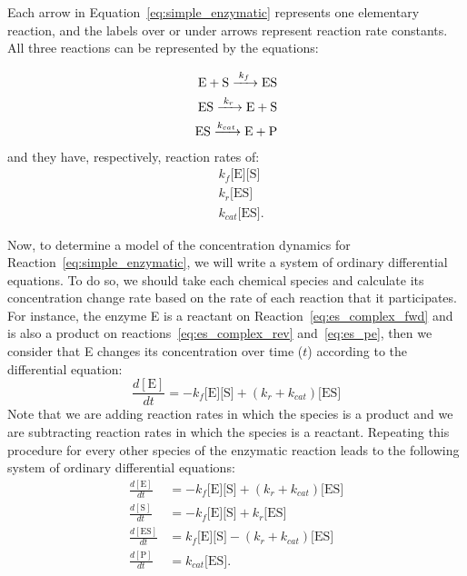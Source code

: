 Each arrow in Equation~\ref{eq:simple_enzymatic} represents one 
elementary reaction, and the labels over or under arrows represent 
reaction rate constants. All three reactions can be represented by the
equations:

\begin{subequations}
\begin{align}
\ce{
    E + S ->[\ce{$k_f$}] ES 
} \label{eq:es_complex_fwd} \\
\ce{
    ES ->[$k_r$] E + S
} \label{eq:es_complex_rev} \\
\ce{
    ES ->[$k_{cat}$] E + P
} \label{eq:es_pe} 
\end{align}
\end{subequations}
and they have, respectively, reaction rates of:
\begin{equation*}
\begin{aligned}
    & k_f\text{[E][S]} \\
    & k_r\text{[ES]} \\
    & k_{cat}\text{[ES]}.
\end{aligned}
\end{equation*}

Now, to determine a model of the concentration dynamics for
Reaction~\ref{eq:simple_enzymatic}, we will write a system of ordinary
differential equations. To do so, we should take each chemical species 
and calculate its concentration change rate based on the rate of each 
reaction that it participates. For instance, the enzyme E is a 
reactant on Reaction~\ref{eq:es_complex_fwd} and is also a product on 
reactions~\ref{eq:es_complex_rev} and~\ref{eq:es_pe}, then we consider 
that E changes its concentration over time ($t$) according to the 
differential equation:
\begin{equation}
    \frac{d[\text{E}]}{dt} = -k_f\text{[E][S]} + (k_r + k_{cat}) \text{[ES]}
\end{equation} 
Note that we are adding reaction rates in which the species is a product
and we are subtracting reaction rates in which the species is a
reactant. Repeating this procedure for every other species of the 
enzymatic reaction leads to the following system of ordinary 
differential equations:
\begin{subequations}
    \label{eq:full_system}
    \begin{align}
        \frac{d[\text{E}]}{dt} & =  
            -k_f\text{[E][S]} + (k_r + k_{cat}) \text{[ES]} 
            \label{eq:dEdt} \\
        \frac{d[\text{S}]}{dt}  & = 
            -k_f\text{[E][S]} + k_r\text{[ES]} 
            \label{eq:dSdt} \\
        \frac{d[\text{ES}]}{dt} & =  
            k_f\text{[E][S]} - (k_r + k_{cat}) \text{[ES]} 
            \label{eq:dESdt} \\
        \frac{d[\text{P}]}{dt} & = k_{cat}\text{[ES]} \label{eq:dPdt}.
    \end{align}
\end{subequations}

